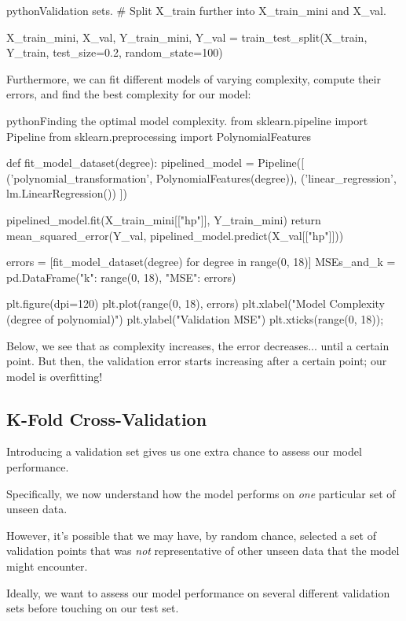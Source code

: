 \documentclass[openany]{book}
\begin{document}
\begin{code}{python}{Validation sets.}
# Split X_train further into X_train_mini and X_val.

X_train_mini, X_val, Y_train_mini, Y_val = train_test_split(X_train, Y_train, test_size=0.2, random_state=100)
\end{code}

Furthermore, we can fit different models of varying complexity, compute their errors, and find the best complexity for our model:
\begin{code}{python}{Finding the optimal model complexity.}
from sklearn.pipeline import Pipeline
from sklearn.preprocessing import PolynomialFeatures

def fit_model_dataset(degree):
pipelined_model = Pipeline([
('polynomial_transformation', PolynomialFeatures(degree)),
('linear_regression', lm.LinearRegression())    
])

pipelined_model.fit(X_train_mini[["hp"]], Y_train_mini)
return mean_squared_error(Y_val, pipelined_model.predict(X_val[["hp"]]))

errors = [fit_model_dataset(degree) for degree in range(0, 18)]
MSEs_and_k = pd.DataFrame({"k": range(0, 18), "MSE": errors})

plt.figure(dpi=120)
plt.plot(range(0, 18), errors)
plt.xlabel("Model Complexity (degree of polynomial)")
plt.ylabel("Validation MSE")
plt.xticks(range(0, 18));
\end{code}

Below, we see that as complexity increases, the error decreases... until a certain point. But then, the validation error starts increasing after a certain point; our model is overfitting!

\subsection{K-Fold Cross-Validation}
Introducing a validation set gives us one extra chance to assess our model performance.

Specifically, we now understand how the model performs on \textit{one} particular set of unseen data.

However, it's possible that we may have, by random chance, selected a set of validation points that was \textit{not} representative of other unseen data that the model might encounter.

Ideally, we want to assess our model performance on several different validation sets before touching on our test set.
\end{document}
